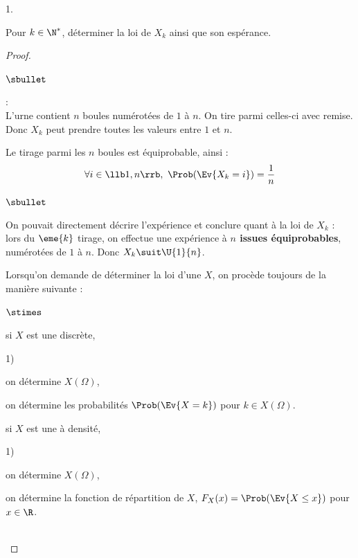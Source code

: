 \documentclass[11pt]{article}%
\begin{document}
\begin{noliste}{1.}
\item Pour $k\in\N^*$, déterminer la loi de $X_k$ ainsi que son espérance.
  
  \begin{proof}~
    \begin{noliste}{$\sbullet$}
    \item {} :\\
      L'urne contient $n$ boules numérotées de $1$ à $n$. On tire
      parmi celles-ci avec remise.\\
      Donc $X_k$ peut prendre toutes les valeurs entre $1$ et $n$.
    \item Le tirage parmi les $n$ boules est équiprobable, ainsi :
      \[
      \forall i \in\llb 1,n\rrb, \ \Prob(\Ev{X_k=i})=\dfrac{1}{n}
      \]
    \end{noliste}


    \newpage


    \begin{remark}%
      \begin{noliste}{$\sbullet$}
      \item On pouvait directement décrire l'expérience et conclure
        quant à la loi de $X_k$ :\\
        lors du $\eme{k}$ tirage, on effectue une expérience à {\bf
          $n$ issues équiprobables}, numérotées de $1$ à $n$. Donc
        $X_k \suit \U{1}{n}$.
      \item Lorsqu'on demande de déterminer la loi d'une \var $X$, on 
        procède toujours de la manière suivante :
        \begin{noliste}{$\stimes$}
        \item si $X$ est une \var discrète,
          \begin{noliste}{1)}
          \item on détermine $X(\Omega)$,
          \item on détermine les probabilités $\Prob(\Ev{X=k})$ pour 
            $k\in X(\Omega)$.
          \end{noliste}
          
        \item si $X$ est une \var à densité,
          \begin{noliste}{1)}
          \item on détermine $X(\Omega)$,
          \item on détermine la fonction de répartition de $X$, 
            $F_X(x)=\Prob(\Ev{X\leq x})$ pour 
            $x\in \R$.
          \end{noliste}
        \end{noliste}
      \end{noliste}
    \end{remark}~\\[-1.4cm]
  \end{proof}
  

\end{noliste}
\end{document}
